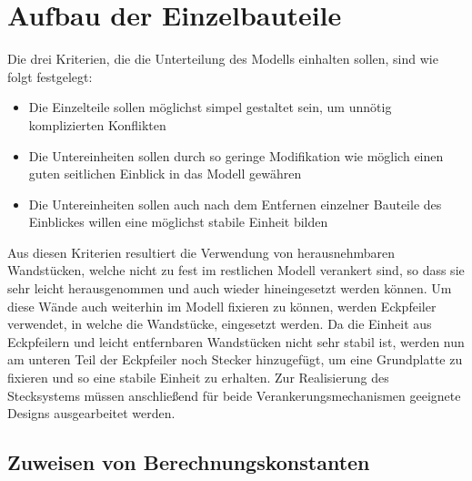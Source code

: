 \section{Aufbau der Einzelbauteile}
Die drei Kriterien, die die Unterteilung des Modells einhalten sollen, sind wie folgt festgelegt:
\begin{itemize}
	\item Die Einzelteile sollen möglichst simpel gestaltet sein, um unnötig komplizierten Konflikten
	\item Die Untereinheiten sollen durch so geringe Modifikation wie möglich einen guten seitlichen Einblick in das Modell gewähren
	\item Die Untereinheiten sollen auch nach dem Entfernen einzelner Bauteile des Einblickes willen eine möglichst stabile Einheit bilden
\end{itemize}
Aus diesen Kriterien resultiert die Verwendung von herausnehmbaren Wandstücken, welche nicht zu fest im restlichen Modell verankert sind, so dass sie sehr leicht herausgenommen und auch wieder hineingesetzt werden können.
Um diese Wände auch weiterhin im Modell fixieren zu können, werden Eckpfeiler verwendet, in welche die Wandstücke, eingesetzt werden.
Da die Einheit aus Eckpfeilern und leicht entfernbaren Wandstücken nicht sehr stabil ist, werden nun am unteren Teil der Eckpfeiler noch Stecker hinzugefügt, um eine Grundplatte zu fixieren und so eine stabile Einheit zu erhalten. Zur Realisierung des Stecksystems müssen anschließend für beide Verankerungsmechanismen geeignete Designs ausgearbeitet werden.

\subsection{Zuweisen von Berechnungskonstanten}

